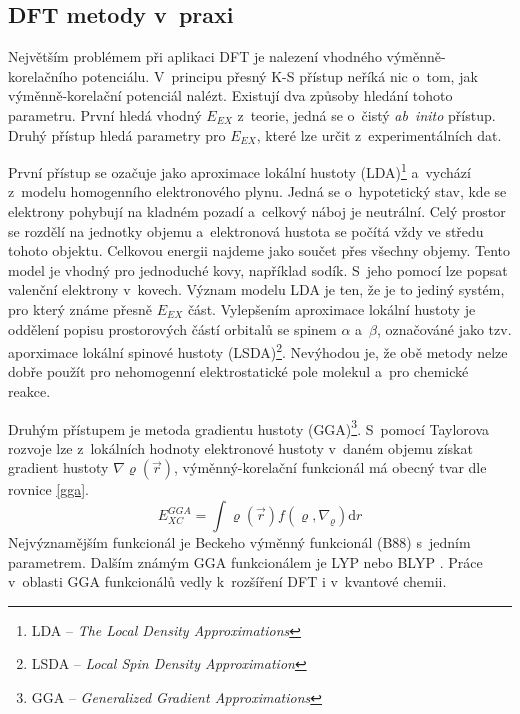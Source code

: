 \documentclass[
digital, %
table,   %
nolof,     %
nolot,     %
oneside,
]{fithesis3}
\begin{document}
\subsection{DFT metody v~praxi}
Největším problémem při aplikaci DFT je nalezení vhodného výměnně-korelačního potenciálu. V~principu přesný K-S přístup neříká nic o~tom, jak výměnně-korelační potenciál nalézt. Existují dva způsoby hledání tohoto parametru. První hledá vhodný $E_{EX}$ z~teorie, jedná se o~čistý \textit{ab~inito} přístup. Druhý přístup hledá parametry pro $E_{EX}$, které lze určit z~experimentálních dat.

První přístup se ozačuje jako aproximace lokální hustoty (LDA)\footnote{LDA -- \textit{The Local Density Approximations}} a~vychází z~modelu homogenního elektronového plynu. Jedná se o~hypotetický stav, kde se elektrony pohybují na kladném pozadí a~celkový náboj je neutrální. Celý prostor se rozdělí na jednotky objemu a~elektronová hustota se počítá vždy ve středu tohoto objektu. Celkovou energii najdeme jako součet přes všechny objemy. Tento model je vhodný pro jednoduché kovy, například sodík. S~jeho pomocí lze popsat valenční elektrony v~kovech. Význam modelu LDA je ten, že je to jediný systém, pro který známe přesně $E_{EX}$ část. Vylepšením aproximace lokální hustoty je oddělení popisu prostorových částí orbitalů se spinem $\alpha$ a~$\beta$, označováné jako tzv. aporximace lokální spinové hustoty (LSDA)\footnote{LSDA -- \textit{Local Spin Density Approximation}}. Nevýhodou je, že obě metody nelze dobře použít pro nehomogenní elektrostatické pole molekul a~pro chemické reakce.

Druhým přístupem je metoda gradientu hustoty (GGA)\footnote{GGA -- \textit{Generalized Gradient Approximations}}. S~pomocí Taylorova rozvoje lze z~lokálních hodnoty elektronové hustoty v~daném objemu získat gradient hustoty $\nabla \varrho(\vec{r})$, výměnný-korelační funkcionál má obecný tvar dle rovnice \ref{gga}.
\begin{equation}
E_{XC}^{GGA} = \int \varrho(\vec{r})f(\varrho, \nabla_{\varrho})\mathrm{d}r
\label{gga}
\end{equation}
Nejvýznamějším funkcionál je Beckeho výměnný funkcionál (B88)\cite{b88} s~jedním parametrem. Dalším známým GGA funkcionálem je LYP \cite{lyp} nebo BLYP \cite{blyp}. Práce v~oblasti GGA funkcionálů vedly k~rozšíření DFT i v~kvantové chemii.
\end{document}
